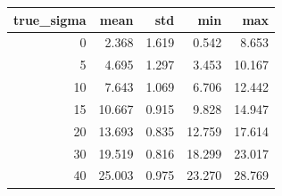 \begin{tabular}{rrrrr}
\toprule
true_sigma & mean & std & min & max \\
\midrule
0 & 2.368 & 1.619 & 0.542 & 8.653 \\
5 & 4.695 & 1.297 & 3.453 & 10.167 \\
10 & 7.643 & 1.069 & 6.706 & 12.442 \\
15 & 10.667 & 0.915 & 9.828 & 14.947 \\
20 & 13.693 & 0.835 & 12.759 & 17.614 \\
30 & 19.519 & 0.816 & 18.299 & 23.017 \\
40 & 25.003 & 0.975 & 23.270 & 28.769 \\
\bottomrule
\end{tabular}

